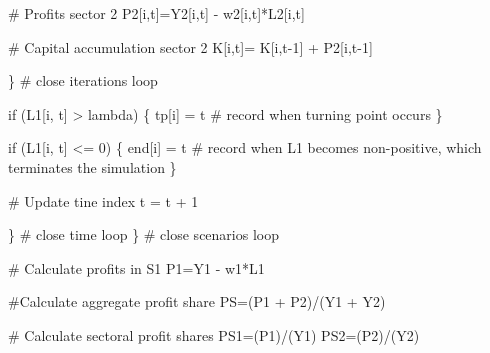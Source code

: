 \documentclass[
  letterpaper,
  DIV=11,
  numbers=noendperiod]{scrreprt}
\newenvironment{Shaded}{\begin{snugshade}}{\end{snugshade}}
\newcommand{\CommentTok}[1]{\textcolor[rgb]{0.37,0.37,0.37}{#1}}
\newcommand{\ControlFlowTok}[1]{\textcolor[rgb]{0.00,0.23,0.31}{#1}}
\newcommand{\DecValTok}[1]{\textcolor[rgb]{0.68,0.00,0.00}{#1}}
\newcommand{\NormalTok}[1]{\textcolor[rgb]{0.00,0.23,0.31}{#1}}
\newcommand{\OtherTok}[1]{\textcolor[rgb]{0.00,0.23,0.31}{#1}}
\newcommand{\SpecialCharTok}[1]{\textcolor[rgb]{0.37,0.37,0.37}{#1}}
\begin{document}
\begin{Shaded}
\begin{Highlighting}[]
      \CommentTok{\# Profits sector 2}
\NormalTok{      P2[i,t]}\OtherTok{=}\NormalTok{Y2[i,t] }\SpecialCharTok{{-}}\NormalTok{ w2[i,t]}\SpecialCharTok{*}\NormalTok{L2[i,t]}
      
      \CommentTok{\# Capital accumulation sector 2}
\NormalTok{      K[i,t]}\OtherTok{=}\NormalTok{ K[i,t}\DecValTok{{-}1}\NormalTok{] }\SpecialCharTok{+}\NormalTok{ P2[i,t}\DecValTok{{-}1}\NormalTok{]}

\NormalTok{    \} }\CommentTok{\# close iterations loop}
    
      \ControlFlowTok{if}\NormalTok{ (L1[i, t] }\SpecialCharTok{\textgreater{}}\NormalTok{ lambda) \{}
\NormalTok{        tp[i] }\OtherTok{=}\NormalTok{ t }\CommentTok{\# record when turning point occurs}
\NormalTok{      \}}
    
      \ControlFlowTok{if}\NormalTok{ (L1[i, t] }\SpecialCharTok{\textless{}=} \DecValTok{0}\NormalTok{) \{}
\NormalTok{        end[i] }\OtherTok{=}\NormalTok{ t }\CommentTok{\# record when L1 becomes non{-}positive, which terminates the simulation}
\NormalTok{      \}}
    
    \CommentTok{\# Update tine index  }
\NormalTok{     t }\OtherTok{=}\NormalTok{ t }\SpecialCharTok{+} \DecValTok{1}

\NormalTok{  \} }\CommentTok{\# close time loop}
\NormalTok{\} }\CommentTok{\# close scenarios loop}

\CommentTok{\# Calculate profits in S1}
\NormalTok{P1}\OtherTok{=}\NormalTok{Y1 }\SpecialCharTok{{-}}\NormalTok{ w1}\SpecialCharTok{*}\NormalTok{L1}

\CommentTok{\#Calculate aggregate profit share }
\NormalTok{PS}\OtherTok{=}\NormalTok{(P1 }\SpecialCharTok{+}\NormalTok{ P2)}\SpecialCharTok{/}\NormalTok{(Y1 }\SpecialCharTok{+}\NormalTok{ Y2)}

\CommentTok{\# Calculate sectoral profit shares}
\NormalTok{PS1}\OtherTok{=}\NormalTok{(P1)}\SpecialCharTok{/}\NormalTok{(Y1)}
\NormalTok{PS2}\OtherTok{=}\NormalTok{(P2)}\SpecialCharTok{/}\NormalTok{(Y2)}
\end{Highlighting}
\end{Shaded}
\end{document}
